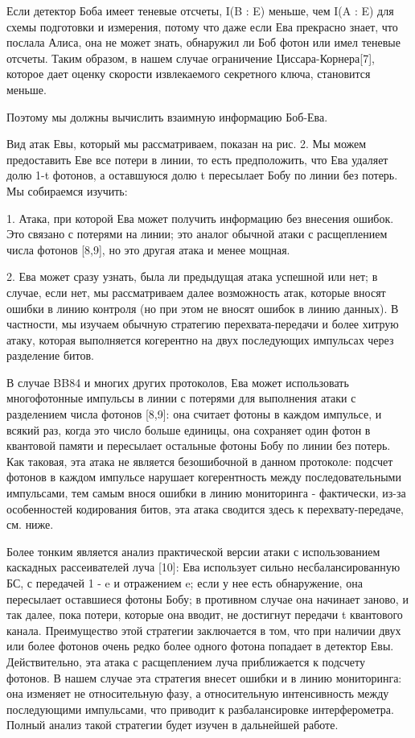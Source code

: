 Если детектор Боба имеет теневые отсчеты, I(B : E) меньше, чем I(A : E) для схемы подготовки и измерения, потому что даже если Ева прекрасно знает, что послала Алиса, она не может знать, обнаружил ли Боб фотон или имел теневые отсчеты. Таким образом, в нашем случае ограничение Циссара-Корнера[7], которое дает оценку скорости извлекаемого секретного ключа, становится меньше.

Поэтому мы должны вычислить взаимную информацию Боб-Ева.

Вид атак Евы, который мы рассматриваем, показан на рис. 2. Мы можем предоставить Еве все потери в линии, то есть предположить, что Ева удаляет долю 1-t фотонов, а оставшуюся долю t пересылает Бобу по линии без потерь. Мы собираемся изучить:

1. Атака, при которой Ева может получить информацию без внесения ошибок. Это связано с потерями на линии; это аналог обычной атаки с расщеплением числа фотонов [8,9], но это другая атака и менее мощная.


2. Ева может сразу узнать, была ли предыдущая атака успешной или нет; в случае, если нет, мы рассматриваем далее возможность атак, которые вносят ошибки в линию контроля (но при этом не вносят ошибок в линию данных). В частности, мы изучаем обычную стратегию перехвата-передачи и более хитрую атаку, которая выполняется когерентно на двух последующих импульсах через разделение битов.

В случае BB84 и многих других протоколов, Ева может использовать многофотонные импульсы в линии с потерями для выполнения атаки с разделением числа фотонов [8,9]: она считает фотоны в каждом импульсе, и всякий раз, когда это число больше единицы, она сохраняет один фотон в квантовой памяти и пересылает остальные фотоны Бобу по линии без потерь. Как таковая, эта атака не является безошибочной в данном протоколе: подсчет фотонов в каждом импульсе нарушает когерентность между последовательными импульсами, тем самым внося ошибки в линию мониторинга - фактически, из-за особенностей кодирования битов, эта атака сводится здесь к перехвату-передаче, см. ниже.

Более тонким является анализ практической версии атаки с использованием каскадных рассеивателей луча [10]: Ева использует сильно несбалансированную БС, с передачей 1 - e и отражением e; если у нее есть обнаружение, она пересылает оставшиеся фотоны Бобу; в противном случае она начинает заново, и так далее, пока потери, которые она вводит, не достигнут передачи t квантового канала. Преимущество этой стратегии заключается в том, что при наличии двух или более фотонов очень редко более одного фотона попадает в детектор Евы. Действительно, эта атака с расщеплением луча приближается к подсчету фотонов. В нашем случае эта стратегия внесет ошибки и в линию мониторинга: она изменяет не относительную фазу, а относительную интенсивность между последующими импульсами, что приводит к разбалансировке интерферометра. Полный анализ такой стратегии будет изучен в дальнейшей работе.

